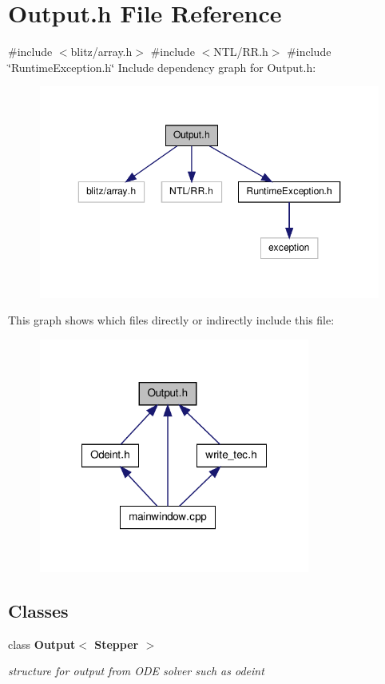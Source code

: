 \section{\-Output.\-h \-File \-Reference}
\label{_output_8h}
{\ttfamily \#include $<$blitz/array.\-h$>$}\*
{\ttfamily \#include $<$\-N\-T\-L/\-R\-R.\-h$>$}\*
{\ttfamily \#include \char`\"{}\-Runtime\-Exception.\-h\char`\"{}}\*
\-Include dependency graph for \-Output.\-h\-:
\nopagebreak
\begin{figure}[H]
\begin{center}
\leavevmode
\includegraphics[width=350pt]{_output_8h__incl}
\end{center}
\end{figure}
\-This graph shows which files directly or indirectly include this file\-:
\nopagebreak
\begin{figure}[H]
\begin{center}
\leavevmode
\includegraphics[width=252pt]{_output_8h__dep__incl}
\end{center}
\end{figure}
\subsection*{\-Classes}
\begin{DoxyCompactItemize}
\item 
class {\bf \-Output$<$ Stepper $>$}
\begin{DoxyCompactList}\small\item\em structure for output from \-O\-D\-E solver such as odeint \end{DoxyCompactList}\end{DoxyCompactItemize}
